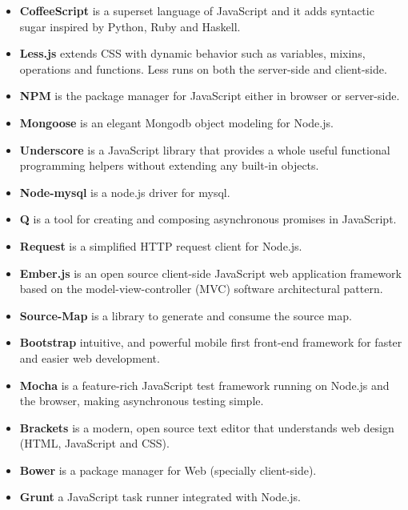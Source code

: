\begin{itemize}
	\item \textbf{CoffeeScript} is a superset language of JavaScript and it adds syntactic sugar inspired by Python, Ruby and Haskell.
	\item \textbf{Less.js} extends CSS with dynamic behavior such as variables, mixins, operations and functions. Less runs on both the server-side and client-side.
	\item \textbf{NPM} is the package manager for JavaScript either in browser or server-side.
	\item \textbf{Mongoose} is an elegant Mongodb object modeling for Node.js.
	\item \textbf{Underscore} is a JavaScript library that provides a whole useful functional programming helpers without extending any built-in objects.
	\item \textbf{Node-mysql} is a node.js driver for mysql.
	\item \textbf{Q} is a tool for creating and composing asynchronous promises in JavaScript. 
	\item \textbf{Request} is a simplified HTTP request client for Node.js.
	\item \textbf{Ember.js} is an open source client-side JavaScript web application framework based on the model-view-controller (MVC) software architectural pattern.
	\item \textbf{Source-Map} is a library to generate and consume the source map.
	\item \textbf{Bootstrap} intuitive, and powerful mobile first front-end framework for faster and easier web development.
	\item \textbf{Mocha} is a feature-rich JavaScript test framework running on Node.js and the browser, making asynchronous testing simple.
	\item \textbf{Brackets} is a modern, open source text editor that understands web design (HTML, JavaScript and CSS).
	\item \textbf{Bower} is a package manager for Web (specially client-side).
	\item \textbf{Grunt} a JavaScript task runner integrated with Node.js.	
\end{itemize} 

